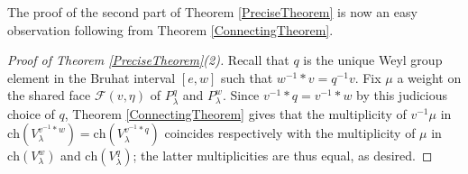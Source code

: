 \documentclass[12pt,reqno]{amsart}
\newtheorem{theorem}{Theorem}[section]
\theoremstyle{definition}
\begin{document}
The proof of the second part of Theorem \ref{PreciseTheorem} is now an easy observation following from Theorem \ref{ConnectingTheorem}. 



\begin{proof}[Proof of Theorem \ref{PreciseTheorem}(2)]
Recall that $q$ is the unique Weyl group element in the Bruhat interval $[e,w]$ such that $w^{-1} \ast v = q^{-1}v$. Fix $\mu$ a weight on the shared face $\mathcal{F}(v,\eta)$ of $P_\lambda^q$ and $P_\lambda^w$. Since $v^{-1}*q = v^{-1}*w$ by this judicious choice of $q$, Theorem \ref{ConnectingTheorem} gives that the multiplicity of $v^{-1}\mu$ in $\mathrm{ch}(V_\lambda^{v^{-1} \ast w}) = \mathrm{ch}(V_\lambda^{v^{-1} \ast q})$ coincides respectively with the multiplicity of $\mu$ in $\mathrm{ch}(V_\lambda^w)$ and $\mathrm{ch}(V_\lambda^q)$; the latter multiplicities are thus equal, as desired. 
\end{proof}






















\end{document}
